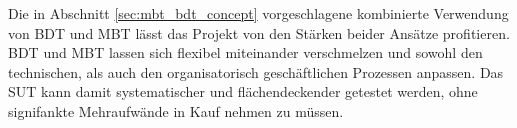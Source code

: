 Die in Abschnitt \ref{sec:mbt_bdt_concept} vorgeschlagene kombinierte Verwendung von \Gls{BDT} und \Gls{MBT} lässt das Projekt von den Stärken beider Ansätze profitieren. \Gls{BDT} und \Gls{MBT} lassen sich flexibel miteinander verschmelzen und sowohl den technischen, als auch den organisatorisch geschäftlichen Prozessen anpassen. Das \Gls{SUT} kann damit systematischer und flächendeckender getestet werden, ohne signifankte Mehraufwände in Kauf nehmen zu müssen.

